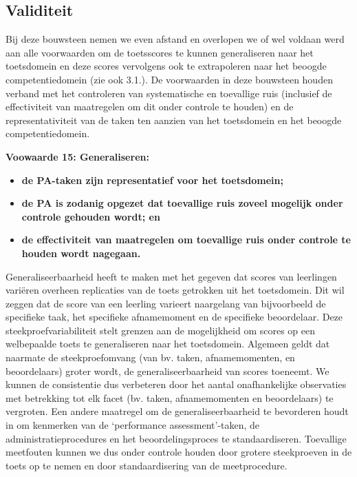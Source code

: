\documentclass[
  letterpaper,
]{report}
\providecommand{\tightlist}{%
  \setlength{\itemsep}{0pt}\setlength{\parskip}{0pt}}
\begin{document}
\hypertarget{validiteit}{%
\subsection{Validiteit}\label{validiteit}}

Bij deze bouwsteen nemen we even afstand en overlopen we of wel voldaan
werd aan alle voorwaarden om de toetsscores te kunnen generaliseren naar
het toetsdomein en deze scores vervolgens ook te extrapoleren naar het
beoogde competentiedomein (zie ook 3.1.). De voorwaarden in deze
bouwsteen houden verband met het controleren van systematische en
toevallige ruis (inclusief de effectiviteit van maatregelen om dit onder
controle te houden) en de representativiteit van de taken ten aanzien
van het toetsdomein en het beoogde competentiedomein.

\textbf{Voowaarde 15: Generaliseren:}

\begin{itemize}
\tightlist
\item
  \textbf{de PA-taken zijn representatief voor het toetsdomein;}
\item
  \textbf{de PA is zodanig opgezet dat toevallige ruis zoveel mogelijk
  onder controle gehouden wordt; en}
\item
  \textbf{de effectiviteit van maatregelen om toevallige ruis onder
  controle te houden wordt nagegaan.}
\end{itemize}

Generaliseerbaarheid heeft te maken met het gegeven dat scores van
leerlingen variëren overheen replicaties van de toets getrokken uit het
toetsdomein. Dit wil zeggen dat de score van een leerling varieert
naargelang van bijvoorbeeld de specifieke taak, het specifieke
afnamemoment en de specifieke beoordelaar. Deze steekproefvariabiliteit
stelt grenzen aan de mogelijkheid om scores op een welbepaalde toets te
generaliseren naar het toetsdomein. Algemeen geldt dat naarmate de
steekproefomvang (van bv. taken, afnamemomenten, en beoordelaars) groter
wordt, de generaliseerbaarheid van scores toeneemt. We kunnen de
consistentie dus verbeteren door het aantal onafhankelijke observaties
met betrekking tot elk facet (bv. taken, afnamemomenten en beoordelaars)
te vergroten. Een andere maatregel om de generaliseerbaarheid te
bevorderen houdt in om kenmerken van de `performance assessment'-taken,
de administratieprocedures en het beoordelingsproces te standaardiseren.
Toevallige meetfouten kunnen we dus onder controle houden door grotere
steekproeven in de toets op te nemen en door standaardisering van de
meetprocedure.
\end{document}
